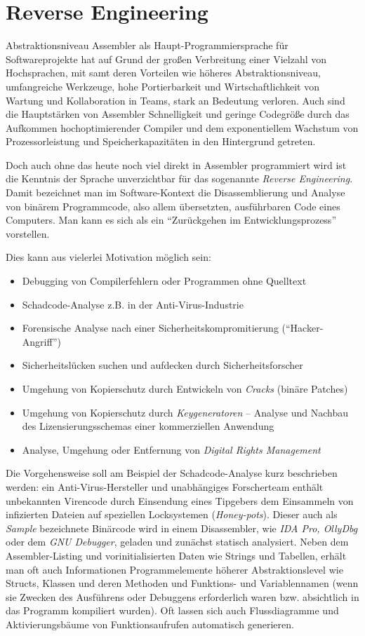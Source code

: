 \section{Reverse Engineering}
Abstraktionsniveau
Assembler als Haupt-Programmiersprache für Softwareprojekte hat auf Grund der großen Verbreitung einer Vielzahl von Hochsprachen, mit samt deren Vorteilen wie höheres Abstraktionsniveau, umfangreiche Werkzeuge, hohe Portierbarkeit und Wirtschaftlichkeit von Wartung und Kollaboration in Teams, stark an Bedeutung verloren. Auch sind die Hauptstärken von Assembler Schnelligkeit und geringe Codegröße durch das Aufkommen hochoptimierender Compiler und dem exponentiellem Wachstum von Prozessorleistung und Speicherkapazitäten in den Hintergrund getreten.

Doch auch ohne das heute noch viel direkt in Assembler programmiert wird ist die Kenntnis der Sprache unverzichtbar für das sogenannte \emph{Reverse Engineering}. Damit bezeichnet man im Software-Kontext die Disassemblierung und Analyse von binärem Programmcode, also allem übersetzten, ausführbaren Code eines Computers. Man kann es sich als ein ``Zurückgehen im Entwicklungsprozess'' vorstellen.\cite{Warden1992}

Dies kann aus vielerlei Motivation möglich sein:
\begin{itemize}
\item Debugging von Compilerfehlern oder Programmen ohne Quelltext
\item Schadcode-Analyse z.B. in der Anti-Virus-Industrie
\item Forensische Analyse nach einer Sicherheitskompromitierung (``Hacker-Angriff'')
\item Sicherheitslücken suchen und aufdecken durch Sicherheitsforscher
\item Umgehung von Kopierschutz durch Entwickeln von \emph{Cracks} (binäre Patches)
\item Umgehung von Kopierschutz durch \emph{Keygeneratoren} – Analyse und Nachbau des Lizensierungsschemas einer kommerziellen Anwendung
\item Analyse, Umgehung oder Entfernung von \emph{Digital Rights Management}
\end{itemize}

Die Vorgehensweise soll am Beispiel der Schadcode-Analyse kurz beschrieben werden: ein Anti-Virus-Hersteller und unabhängiges Forscherteam enthält unbekannten Virencode durch Einsendung eines Tipgebers dem Einsammeln von infizierten Dateien auf speziellen Locksystemen (\emph{Honey-pots}). Dieser auch als \emph{Sample} bezeichnete Binärcode wird in einem Disassembler, wie \emph{IDA Pro, OllyDbg} oder dem \emph{GNU Debugger}\cite{disasm}, geladen und zunächst statisch analysiert. Neben dem Assembler-Listing und vorinitialisierten Daten wie Strings und Tabellen, erhält man oft auch Informationen Programmelemente höherer Abstraktionslevel wie Structs, Klassen und deren Methoden und Funktions- und Variablennamen (wenn sie Zwecken des Ausführens oder Debuggens erforderlich waren bzw. absichtlich in das Programm kompiliert wurden).
Oft lassen sich auch Flussdiagramme und Aktivierungsbäume von Funktionsaufrufen automatisch generieren.

